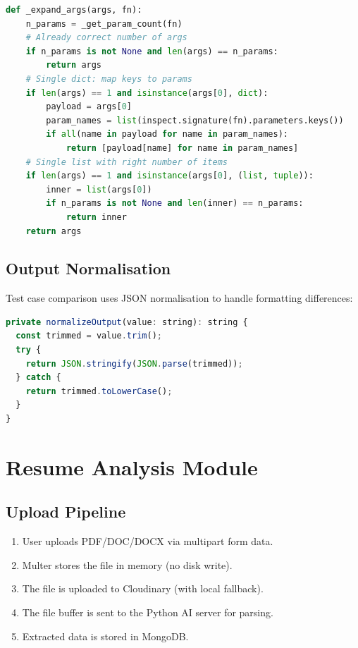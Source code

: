 \begin{lstlisting}[language=Python, caption={Python Argument Normalisation}]
def _expand_args(args, fn):
    n_params = _get_param_count(fn)
    # Already correct number of args
    if n_params is not None and len(args) == n_params:
        return args
    # Single dict: map keys to params
    if len(args) == 1 and isinstance(args[0], dict):
        payload = args[0]
        param_names = list(inspect.signature(fn).parameters.keys())
        if all(name in payload for name in param_names):
            return [payload[name] for name in param_names]
    # Single list with right number of items
    if len(args) == 1 and isinstance(args[0], (list, tuple)):
        inner = list(args[0])
        if n_params is not None and len(inner) == n_params:
            return inner
    return args
\end{lstlisting}

\subsection{Output Normalisation}

Test case comparison uses JSON normalisation to handle formatting differences:
\begin{lstlisting}[language=JavaScript, caption={Output Normalisation}]
private normalizeOutput(value: string): string {
  const trimmed = value.trim();
  try {
    return JSON.stringify(JSON.parse(trimmed));
  } catch {
    return trimmed.toLowerCase();
  }
}
\end{lstlisting}

\section{Resume Analysis Module}

\subsection{Upload Pipeline}

\begin{enumerate}
    \item User uploads PDF/DOC/DOCX via multipart form data.
    \item Multer stores the file in memory (no disk write).
    \item The file is uploaded to Cloudinary (with local fallback).
    \item The file buffer is sent to the Python AI server for parsing.
    \item Extracted data is stored in MongoDB.
\end{enumerate}

